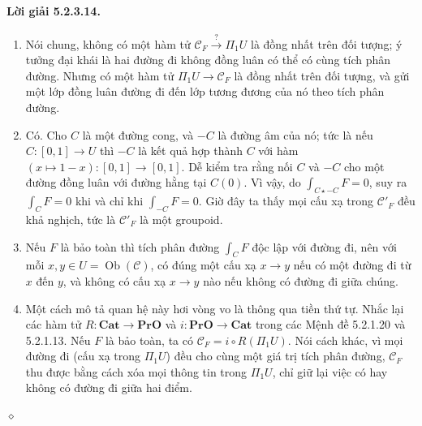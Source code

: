 \paragraph{Lời giải 5.2.3.14.}
\begin{enumerate}[label=\alph*.]
\item Nói chung, không có một hàm tử $\mathcal C_F\xrightarrow{?}\Pi_1U$ là đồng nhất trên đối tượng; ý tưởng đại khái là hai đường đi không đồng luân có thể có cùng tích phân đường. Nhưng có một hàm tử $\Pi_1U\to\mathcal C_F$ là đồng nhất trên đối tượng, và gửi một lớp đồng luân đường đi đến lớp tương đương của nó theo tích phân đường.
\item Có. Cho $C$ là một đường cong, và $-C$ là đường âm của nó; tức là nếu $C:[0,1]\to U$ thì $-C$ là kết quả hợp thành $C$ với hàm $(x\mapsto1-x):[0,1]\to[0,1]$. Dễ kiểm tra rằng nối $C$ và $-C$ cho một đường đồng luân với đường hằng tại $C(0)$. Vì vậy, do $\int_{C\star-C}F=0$, suy ra $\int_CF=0$ khi và chỉ khi $\int_{-C}F=0$. Giờ đây ta thấy mọi cấu xạ trong $\mathcal C'_F$ đều khả nghịch, tức là $\mathcal C'_F$ là một groupoid.
\item Nếu $F$ là bảo toàn thì tích phân đường $\int_CF$ độc lập với đường đi, nên với mỗi $x,y\in U=\operatorname{Ob}(\mathcal C)$, có đúng một cấu xạ $x\to y$ nếu có một đường đi từ $x$ đến $y$, và không có cấu xạ $x\to y$ nào nếu không có đường đi giữa chúng.
\item Một cách mô tả quan hệ này hơi vòng vo là thông qua tiền thứ tự. Nhắc lại các hàm tử $R:\mathbf{Cat}\to\mathbf{PrO}$ và $i:\mathbf{PrO}\to\mathbf{Cat}$ trong các Mệnh đề 5.2.1.20 và 5.2.1.13. Nếu $F$ là bảo toàn, ta có $\mathcal C_F=i\circ R(\Pi_1U)$. Nói cách khác, vì mọi đường đi (cấu xạ trong $\Pi_1U$) đều cho cùng một giá trị tích phân đường, $\mathcal C_F$ thu được bằng cách xóa mọi thông tin trong $\Pi_1U$, chỉ giữ lại việc có hay không có đường đi giữa hai điểm.
\end{enumerate}\hfill$\diamond$
